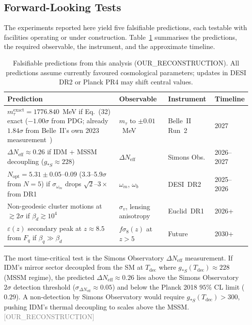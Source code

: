 \documentclass[twocolumn,prd,amsmath,amssymb,floatfix]{revtex4-2}
\newcommand{\reconstruction}{\textcolor{gray}{\small[OUR\_RECONSTRUCTION]}}
\begin{document}
\subsection{Forward-Looking Tests}
\label{sec:predictions}

The experiments reported here yield five falsifiable predictions, each
testable with facilities operating or under construction.
Table~\ref{tab:predictions} summarises the predictions, the required
observable, the instrument, and the approximate timeline.

\begin{table}[tb]
\caption{Falsifiable predictions from this analysis (OUR\_RECONSTRUCTION).
All predictions assume currently favoured cosmological parameters;
updates in DESI DR2 or Planck PR4 may shift central values.}
\label{tab:predictions}
\begin{ruledtabular}
\begin{tabular}{p{5.5cm}p{3.5cm}p{2.5cm}l}
Prediction & Observable & Instrument & Timeline \\
\hline
$m_\tau^\mathrm{exact} = 1776.840$~MeV if Eq.~(32) exact ($-1.00\sigma$ from PDG; already $1.84\sigma$ from Belle~II's own 2023 measurement~\cite{belleii2023taumass}) &
$m_\tau$ to $\pm0.01$~MeV & Belle~II Run~2~\cite{belleii2019} & 2027 \\
$\Delta N_\mathrm{eff} \approx 0.26$ if IDM + MSSM decoupling ($g_{*S} \approx 228$) &
$\Delta N_\mathrm{eff}$ & Simons Obs. & 2026--2027 \\
$N_\mathrm{opt} = 5.31 \pm 0.05$--$0.09$ (3.3--5.9$\sigma$ from $N{=}5$) if $\sigma_{\omega_m}$ drops $\sqrt{2}$--$3\times$ from DR1 &
$\omega_m$, $\omega_b$ & DESI~DR2 & 2025--2026 \\
Non-geodesic cluster motions at $\gtrsim 2\sigma$ if $\beta_d \gtrsim 10^4$ &
$\sigma_v$, lensing anisotropy & Euclid~DR1 & 2026+ \\
$\varepsilon(z)$ secondary peak at $z \approx 8.5$ from $F_q$ if $\beta_q \gg \beta_d$ &
$f\sigma_8(z)$ at $z > 5$ & Future & 2030+ \\
\end{tabular}
\end{ruledtabular}
\end{table}

The most time-critical test is the Simons Observatory $\Delta N_\mathrm{eff}$
measurement.
If IDM's mirror sector decoupled from the SM at $T_\mathrm{dec}$ where
$g_{*S}(T_\mathrm{dec}) \approx 228$ (MSSM regime), the predicted
$\Delta N_\mathrm{eff} \approx 0.26$ lies above the Simons Observatory
$2\sigma$ detection threshold ($\sigma_{\Delta N_\mathrm{eff}} \approx 0.05$)
and below the Planck 2018 $95\%$ CL limit ($0.29$).
A non-detection by Simons Observatory would require $g_{*S}(T_\mathrm{dec}) > 300$,
pushing IDM's thermal decoupling to scales above the MSSM.
\reconstruction
\end{document}
